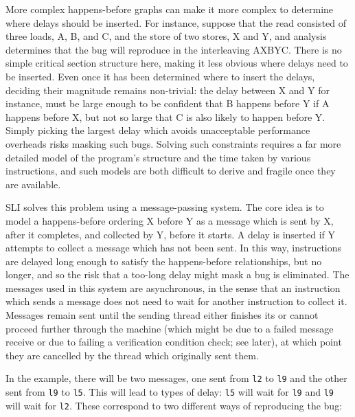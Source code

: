\documentclass[12pt,a4paper]{book}
\begin{document}
More complex happens-before graphs can make it more complex to determine where delays should be inserted.
For instance, suppose that the read \StateMachine consisted of three loads, A, B, and C, and the store \StateMachine of two stores, X and Y, and analysis determines that the bug will reproduce in the interleaving AXBYC.
There is no simple critical section structure here, making it less obvious where delays need to be inserted.
Even once it has been determined where to insert the delays, deciding their magnitude remains non-trivial: the delay between X and Y for instance, must be large enough to be confident that B happens before Y if A happens before X, but not so large that C is also likely to happen before Y.
Simply picking the largest delay which avoids unacceptable performance overheads risks masking such bugs.
Solving such constraints requires a far more detailed model of the program's structure and the time taken by various instructions, and such models are both difficult to derive and fragile once they are available.

SLI solves this problem using a message-passing system.
The core idea is to model a happens-before ordering X before Y as a message which is sent by X, after it completes, and collected by Y, before it starts.
A delay is inserted if Y attempts to collect a message which has not been sent.
In this way, instructions are delayed long enough to satisfy the happens-before relationships, but no longer, and so the risk that a too-long delay might mask a bug is eliminated.
The messages used in this system are asynchronous, in the sense that an instruction which sends a message does not need to wait for another instruction to collect it.
Messages remain sent until the sending thread either finishes its \StateMachine or cannot proceed further through the machine (which might be due to a failed message receive or due to failing a verification condition check; see later), at which point they are cancelled by the thread which originally sent them.

In the example, there will be two messages, one sent from \verb|l2| to \verb|l9| and the other sent from \verb|l9| to \verb|l5|.
This will lead to types of delay: \verb|l5| will wait for \verb|l9| and \verb|l9| will wait for \verb|l2|.
These correspond to two different ways of reproducing the bug:
\end{document}
